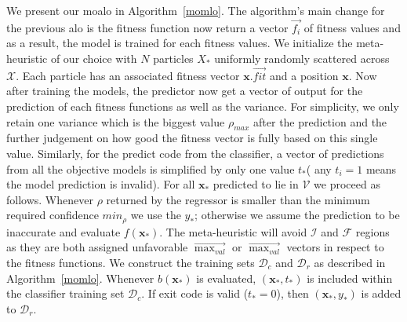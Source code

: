 \documentclass[11pt, runningheads,a4paper]{llncs}
\begin{document}
We present our \ac{moalo} in Algorithm~\ref{momlo}. The algorithm's main change for the previous \ac{alo} \cite{arc2012MLO} is the fitness function now return a vector $\overrightarrow{f_i}$ of fitness values and as a result, the model is trained for each fitness values.  We initialize the meta-heuristic of our choice with $N$ particles $X_*$ uniformly randomly scattered across $\mathcal{X}$. Each particle has an associated fitness vector $\mathbf{x}.\overrightarrow{fit}$ and a position $\mathbf{x}$. Now after training the models, the predictor now get a vector of output for the prediction of each fitness functions as well as the variance. For simplicity, we only retain one variance which is the biggest value $\rho_{max}$ after the prediction and the further judgement on how good the fitness vector is fully based on this single value. Similarly, for the predict code from the classifier, a vector of predictions from all the objective models is simplified by only one value $t_*$( any $t_i = 1$ means the model prediction is invalid). For all $\mathbf{x_*}$ predicted to lie in $\mathcal{V}$ we proceed as follows. Whenever $\rho$ returned by the regressor is smaller than the minimum required confidence $min_{\rho}$ we use the $y_*$; otherwise we assume the prediction to be inaccurate and evaluate $f(\mathbf{x_*})$. The meta-heuristic will avoid $\mathcal{I}$ and $\mathcal{F}$ regions as they are both assigned unfavorable $\vec{\max_{val}}$ or $\vec{\max_{val}}$ vectors in respect to the fitness functions. We construct the training sets $\mathcal{D}_{c}$ and $\mathcal{D}_{r}$ as described in Algorithm~\ref{momlo}. Whenever $b(\mathbf{x_*})$ is evaluated,  $(\mathbf{x_*},t_*)$ is included within the classifier training set $\mathcal{D}_{c}$. If exit code is valid ($t_*=0$), then $(\mathbf{x_*},y_*)$ is added to $\mathcal{D}_{r}$. 
\end{document}
